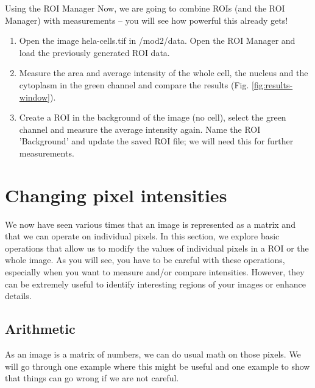 \newpage
\begin{taskbox}{Using the ROI Manager}
Now, we are going to combine ROIs (and the ROI Manager) with measurements -- you will see how powerful this already gets!
\begin{enumerate}
	\item Open the image hela-cells.tif in /mod2/data. Open the ROI Manager and load the previously generated ROI data.
	\item Measure the area and average intensity of the whole cell, the nucleus and the cytoplasm in the green channel and compare the results (Fig. \ref{fig:results-window}).
	
		\begin{minipage}[t]{\linewidth}
		\begin{center}
		\medskip
		\label{fig:results-window}
		\end{center}
	\end{minipage}
	
	\item Create a ROI in the background of the image (no cell), select the green channel and measure the average intensity again. Name the ROI 'Background' and update the saved ROI file; we will need this for further measurements.
\end{enumerate}	
\end{taskbox}

\section{Changing pixel intensities}
We now have seen various times that an image is represented as a matrix and that we can operate on individual pixels. In this section, we explore basic operations that allow us to modify the values of individual pixels in a ROI or the whole image. As you will see, you have to be careful with these operations, especially when you want to measure and/or compare intensities. However, they can be extremely useful to identify interesting regions of your images or enhance details.

\subsection{Arithmetic}
As an image is a matrix of numbers, we can do usual math on those pixels. We will go through one example where this might be useful and one example to show that things can go wrong if we are not careful.

